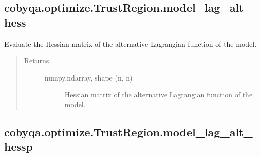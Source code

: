 \documentclass[letterpaper,10pt,english]{sphinxmanual}
\begin{document}
\begin{fulllineitems}
\begin{fulllineitems}
\end{fulllineitems}



\subsection{cobyqa.optimize.TrustRegion.model\_lag\_alt\_hess}
\label{\detokenize{refs/generated/cobyqa.optimize.TrustRegion.model_lag_alt_hess:cobyqa-optimize-trustregion-model-lag-alt-hess}}\label{\detokenize{refs/generated/cobyqa.optimize.TrustRegion.model_lag_alt_hess::doc}}

\begin{fulllineitems}
\label{\detokenize{refs/generated/cobyqa.optimize.TrustRegion.model_lag_alt_hess:cobyqa.optimize.TrustRegion.model_lag_alt_hess}}
\sphinxAtStartPar
Evaluate the Hessian matrix of the alternative Lagrangian function of
the model.
\begin{quote}\begin{description}
\item[{Returns}] \leavevmode\begin{description}
\item[{numpy.ndarray, shape (n, n)}] \leavevmode
\sphinxAtStartPar
Hessian matrix of the alternative Lagrangian function of the model.

\end{description}

\end{description}\end{quote}

\end{fulllineitems}



\subsection{cobyqa.optimize.TrustRegion.model\_lag\_alt\_hessp}
\label{\detokenize{refs/generated/cobyqa.optimize.TrustRegion.model_lag_alt_hessp:cobyqa-optimize-trustregion-model-lag-alt-hessp}}\label{\detokenize{refs/generated/cobyqa.optimize.TrustRegion.model_lag_alt_hessp::doc}}


\end{fulllineitems}
\end{document}
